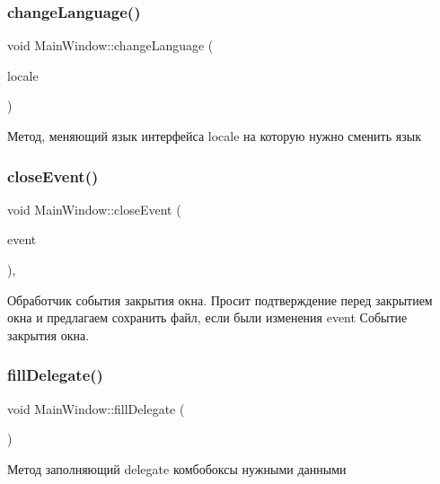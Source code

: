 \subsubsection{\texorpdfstring{changeLanguage()}{changeLanguage()}}
{\footnotesize\ttfamily void Main\+Window\+::change\+Language (\begin{DoxyParamCaption}\item[{Q\+String}]{locale }\end{DoxyParamCaption})\hspace{0.3cm}{\ttfamily [private]}}

Метод, меняющий язык интерфейса locale на которую нужно сменить язык \mbox{\label{class_main_window_a05fb9d72c044aa3bb7d187b994704e2f}} 
\subsubsection{\texorpdfstring{closeEvent()}{closeEvent()}}
{\footnotesize\ttfamily void Main\+Window\+::close\+Event (\begin{DoxyParamCaption}\item[{Q\+Close\+Event $\ast$}]{event }\end{DoxyParamCaption})\hspace{0.3cm}{\ttfamily [override]}, {\ttfamily [protected]}}

Обработчик события закрытия окна. Просит подтверждение перед закрытием окна и предлагаем сохранить файл, если были изменения event Событие закрытия окна. \mbox{\label{class_main_window_a3daa11e9616a5f65638e98ef3b83919b}} 
\subsubsection{\texorpdfstring{fillDelegate()}{fillDelegate()}}
{\footnotesize\ttfamily void Main\+Window\+::fill\+Delegate (\begin{DoxyParamCaption}{ }\end{DoxyParamCaption})\hspace{0.3cm}{\ttfamily [private]}}

Метод заполняющий delegate комбобоксы нужными данными \mbox{\label{class_main_window_a7245b2b62e72712644389e626ecc43a6}} 
